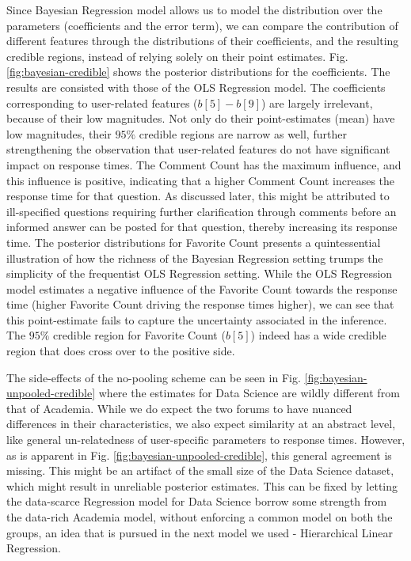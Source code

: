 \documentclass[12pt]{article}
\begin{document}
Since Bayesian Regression model allows us to model the distribution over the parameters (coefficients and the error term), we can compare the contribution of different features through the distributions of their coefficients, and the resulting credible regions, instead of relying solely on their point estimates. Fig. \ref{fig:bayesian-credible} shows the posterior distributions for the coefficients. The results are consisted with those of the OLS Regression model. The coefficients corresponding to user-related features ($b[5]-b[9]$) are largely irrelevant, because of their low magnitudes. Not only do their point-estimates (mean) have low magnitudes, their $95\%$ credible regions are narrow as well, further strengthening the observation that user-related features do not have significant impact on response times. The Comment Count has the maximum influence, and this influence is positive, indicating that a higher Comment Count increases the response time for that question. As discussed later, this might be attributed to ill-specified questions requiring further clarification through comments before an informed answer can be posted for that question, thereby increasing its response time. The posterior distributions for Favorite Count presents a quintessential illustration of how the richness of the Bayesian Regression setting trumps the simplicity of the frequentist OLS Regression setting. While the OLS Regression model estimates a negative influence of the Favorite Count towards the response time (higher Favorite Count driving the response times higher), we can see that this point-estimate fails to capture the uncertainty associated in the inference. The $95\%$ credible region for Favorite Count ($b[5]$) indeed has a wide credible region that does cross over to the positive side.

The side-effects of the no-pooling scheme can be seen in Fig. \ref{fig:bayesian-unpooled-credible} where the estimates for Data Science are wildly different from that of Academia. While we do expect the two forums to have nuanced differences in their characteristics, we also expect similarity at an abstract level, like general un-relatedness of user-specific parameters to response times. However, as is apparent in Fig. \ref{fig:bayesian-unpooled-credible}, this general agreement is missing. This might be an artifact of the small size of the Data Science dataset, which might result in unreliable posterior estimates. This can be fixed by letting the data-scarce Regression model for Data Science borrow some strength from the data-rich Academia model, without enforcing a common model on both the groups, an idea that is pursued in the next model we used - Hierarchical Linear Regression.
\end{document}
